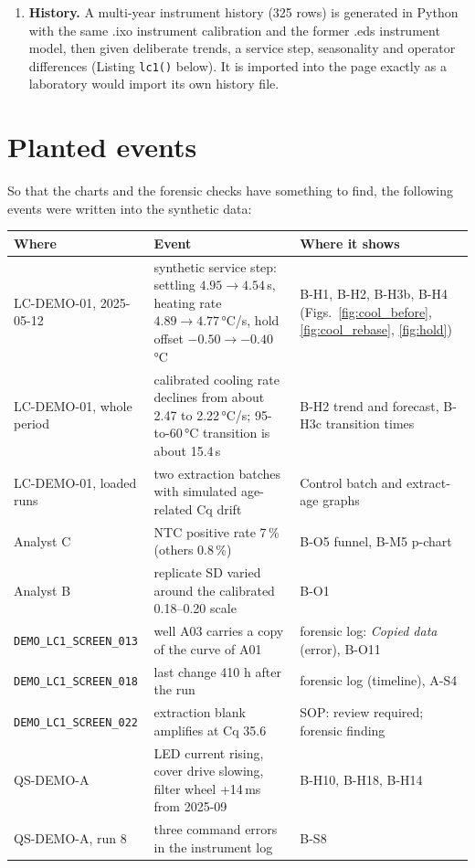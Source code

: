 \begin{enumerate}
\begin{itemize}
      \item stored relative quantification: recomputed from the synthetic Cts ($2^{-\Delta\Delta C_q}$).
      \end{itemize}
      A leak check then searches every synthetic run for the identifiers of the templates; the data set is used only when
      nothing is found.
\item \textbf{History.} A multi-year instrument history (325 rows) is generated in Python with the same .ixo instrument
      calibration and the former .eds instrument model, then given deliberate trends, a service step, seasonality and operator differences
      (Listing \texttt{lc1()} below). It is imported into the page exactly as a laboratory would import its own history file.
\end{enumerate}



\section{Planted events}
So that the charts and the forensic checks have something to find, the following events were written into the synthetic data:

\begin{center}\footnotesize
\begin{tabular}{@{}p{3.3cm}p{5.6cm}p{6.6cm}@{}}\toprule
Where & Event & Where it shows\\\midrule
LC-DEMO-01, 2025-05-12 & synthetic service step: settling $4.95\to4.54$\,s, heating rate $4.89\to4.77$\,°C/s, hold offset $-0.50\to-0.40$\,°C & B-H1, B-H2, B-H3b, B-H4 (Figs.~\ref{fig:cool_before}, \ref{fig:cool_rebase}, \ref{fig:hold})\\
LC-DEMO-01, whole period & calibrated cooling rate declines from about 2.47 to 2.22\,°C/s; 95-to-60\,°C transition is about 15.4\,s & B-H2 trend and forecast, B-H3c transition times\\
LC-DEMO-01, loaded runs & two extraction batches with simulated age-related Cq drift & Control batch and extract-age graphs\\
Analyst C & NTC positive rate 7\,\% (others 0.8\,\%) & B-O5 funnel, B-M5 p-chart\\
Analyst B & replicate SD varied around the calibrated 0.18--0.20 scale & B-O1\\
\texttt{DEMO\_LC1\_SCREEN\_013} & well A03 carries a copy of the curve of A01 & forensic log: \emph{Copied data} (error), B-O11\\
\texttt{DEMO\_LC1\_SCREEN\_018} & last change 410 h after the run & forensic log (timeline), A-S4\\
\texttt{DEMO\_LC1\_SCREEN\_022} & extraction blank amplifies at Cq 35.6 & SOP: review required; forensic finding\\
QS-DEMO-A & LED current rising, cover drive slowing, filter wheel +14\,ms from 2025-09 & B-H10, B-H18, B-H14\\
QS-DEMO-A, run 8 & three command errors in the instrument log & B-S8\\\bottomrule
\end{tabular}
\end{center}

